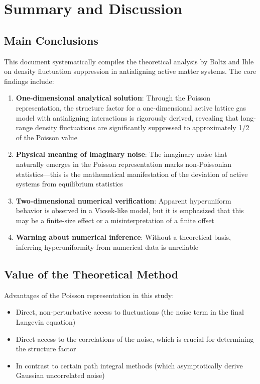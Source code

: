 
\section{Summary and Discussion}\label{sec:conclusion}

\subsection{Main Conclusions}

This document systematically compiles the theoretical analysis by Boltz and Ihle on density fluctuation suppression in antialigning active matter systems. The core findings include:

\begin{enumerate}
    \item \textbf{One-dimensional analytical solution}: Through the Poisson representation, the structure factor for a one-dimensional active lattice gas model with antialigning interactions is rigorously derived, revealing that long-range density fluctuations are significantly suppressed to approximately 1/2 of the Poisson value
    
    \item \textbf{Physical meaning of imaginary noise}: The imaginary noise that naturally emerges in the Poisson representation marks non-Poissonian statistics---this is the mathematical manifestation of the deviation of active systems from equilibrium statistics
    
    \item \textbf{Two-dimensional numerical verification}: Apparent hyperuniform behavior is observed in a Vicsek-like model, but it is emphasized that this may be a finite-size effect or a misinterpretation of a finite offset
    
    \item \textbf{Warning about numerical inference}: Without a theoretical basis, inferring hyperuniformity from numerical data is unreliable
\end{enumerate}

\subsection{Value of the Theoretical Method}

Advantages of the Poisson representation in this study:
\begin{itemize}
    \item Direct, non-perturbative access to fluctuations (the noise term in the final Langevin equation)
    \item Direct access to the correlations of the noise, which is crucial for determining the structure factor
    \item In contrast to certain path integral methods (which asymptotically derive Gaussian uncorrelated noise)
\end{itemize}

